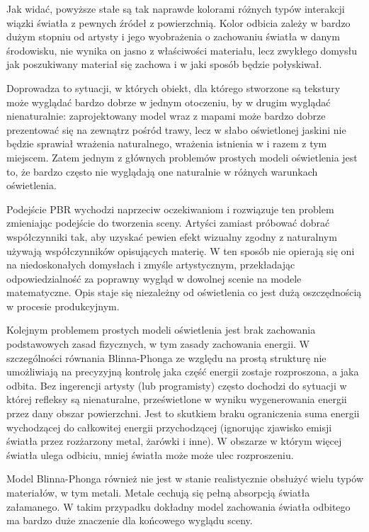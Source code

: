 \documentclass[../main.tex]{subfiles}
\begin{document}
Jak widać, powyższe stałe są tak naprawde kolorami różnych typów interakcji
wiązki światła z pewnych źródeł z powierzchnią. Kolor odbicia zależy w bardzo
dużym stopniu od artysty i jego wyobrażenia o zachowaniu światła w danym
środowisku, nie wynika on jasno z właściwości materiału, lecz zwykłego domysłu
jak poszukiwany materiał się zachowa i w jaki sposób będzie połyskiwał.

Doprowadza to sytuacji, w których obiekt, dla którego stworzone są tekstury
może wyglądać bardzo dobrze w jednym otoczeniu, by w drugim wyglądać
nienaturalnie: zaprojektowany model wraz z mapami może bardzo dobrze
prezentować się na zewnątrz pośród trawy, lecz w słabo oświetlonej jaskini nie
będzie sprawiał wrażenia naturalnego, wrażenia istnienia w i razem z tym
miejscem. Zatem jednym z głównych problemów prostych modeli oświetlenia jest
to, że bardzo często nie wyglądają one naturalnie w różnych warunkach
oświetlenia.

Podejście PBR wychodzi naprzeciw oczekiwaniom i rozwiązuje ten problem
zmieniając podejście do tworzenia sceny. Artyści zamiast próbować dobrać
współczynniki tak, aby uzyskać pewien efekt wizualny zgodny z naturalnym
używają współczynników opisujących materię. W ten sposób nie opierają się oni
na niedoskonałych domysłach i zmyśle artystycznym, przekładając
odpowiedzialność za poprawny wygląd w dowolnej scenie na modele matematyczne.
Opis staje się niezależny od oświetlenia co jest dużą oszczędnością w procesie
produkcyjnym.

Kolejnym problemem prostych modeli oświetlenia jest brak zachowania
podstawowych zasad fizycznych, w tym zasady zachowania energii. W szczególności
równania Blinna-Phonga ze względu na prostą strukturę nie umożliwiają na
precyzyjną kontrolę jaka część energii zostaje rozproszona, a jaka odbita. Bez
ingerencji artysty (lub programisty) często dochodzi do sytuacji w której
refleksy są nienaturalne, prześwietlone w wyniku wygenerowania energii przez
dany obszar powierzchni. Jest to skutkiem braku ograniczenia suma energii
wychodzącej do całkowitej energii przychodzącej (ignorując zjawisko emisji
światła przez rozżarzony metal, żarówki i inne). W obszarze w którym więcej
światła ulega odbiciu, mniej światła może może ulec rozproszeniu.

Model Blinna-Phonga również nie jest w stanie realistycznie obsłużyć wielu
typów materiałów, w tym metali. Metale cechują się pełną absorpcją światła
załamanego. W takim przypadku dokładny model zachowania światła odbitego ma
bardzo duże znaczenie dla końcowego wyglądu sceny.
\end{document}

